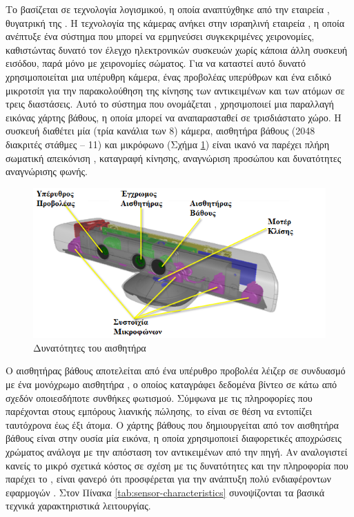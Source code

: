 Το  βασίζεται σε τεχνολογία λογισμικού, η οποία αναπτύχθηκε από την εταιρεία , θυγατρική της . Η τεχνολογία της κάμερας ανήκει στην ισραηλινή εταιρεία , η οποία ανέπτυξε ένα σύστημα που μπορεί να ερμηνεύσει συγκεκριμένες χειρονομίες, καθιστώντας δυνατό τον έλεγχο ηλεκτρονικών συσκευών χωρίς κάποια άλλη συσκευή εισόδου, παρά μόνο με χειρονομίες σώματος. Για να καταστεί αυτό δυνατό χρησιμοποιείται μια υπέρυθρη κάμερα, ένας προβολέας υπερύθρων και ένα ειδικό μικροτσίπ για την παρακολούθηση της κίνησης των αντικειμένων και των ατόμων σε τρεις διαστάσεις. Αυτό το σύστημα  που ονομάζεται , χρησιμοποιεί μια παραλλαγή εικόνας χάρτης βάθους, η οποία μπορεί να αναπαρασταθεί σε τρισδιάστατο χώρο. Η συσκευή διαθέτει μία  (τρία κανάλια των 8\-) κάμερα, αισθητήρα βάθους (2048 διακριτές στάθμες -- 11\-) και  μικρόφωνο (Σχήμα \ref{fig:kinect-characteristics}) είναι ικανό να παρέχει πλήρη σωματική απεικόνιση , καταγραφή κίνησης, αναγνώριση προσώπου και δυνατότητες αναγνώρισης φωνής.

\begin{figure}[H]
    \centering
    \includegraphics[width=.7\textwidth, height=.2\textheight, keepaspectratio]{fig/kinect-characteristics.png}
    \caption{Δυνατότητες του αισθητήρα \protect\footnotemark}
    \label{fig:kinect-characteristics}
\end{figure}

Ο αισθητήρας βάθους αποτελείται από ένα υπέρυθρο προβολέα λέιζερ σε συνδυασμό με ένα μονόχρωμο αισθητήρα , ο οποίος καταγράφει δεδομένα βίντεο σε  κάτω από σχεδόν οποιεσδήποτε συνθήκες φωτισμού. Σύμφωνα με τις πληροφορίες που παρέχονται στους εμπόρους λιανικής πώλησης, το  είναι σε θέση να εντοπίζει ταυτόχρονα έως έξι άτομα. Ο χάρτης βάθους που δημιουργείται από τον αισθητήρα βάθους είναι στην ουσία μία εικόνα, η οποία χρησιμοποιεί διαφορετικές αποχρώσεις χρώματος ανάλογα με την απόσταση τον αντικειμένων από την πηγή. Αν αναλογιστεί κανείς το μικρό σχετικά κόστος σε σχέση με τις δυνατότητες και την πληροφορία που παρέχει το , είναι φανερό ότι προσφέρεται για την ανάπτυξη πολύ ενδιαφέροντων εφαρμογών \cite{jean13}. Στον Πίνακα \ref{tab:sensor-characteristics} συνοψίζονται τα βασικά τεχνικά χαρακτηριστικά λειτουργίας.

